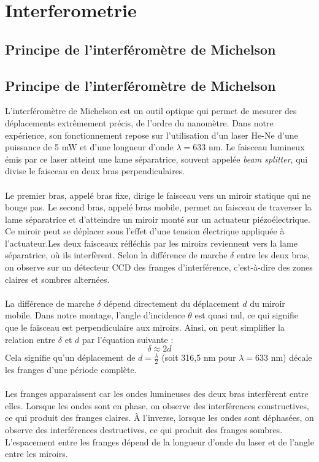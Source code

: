 \section{Interferometrie}
\subsection{Principe de l'interféromètre de Michelson}
\subsection{Principe de l'interféromètre de Michelson}

L'interféromètre de Michelson est un outil optique qui permet de mesurer des déplacements extrêmement précis, de l'ordre du nanomètre. Dans notre expérience, son fonctionnement repose sur l'utilisation d'un laser He-Ne d'une puissance de 5 mW et d'une longueur d'onde $\lambda = 633$ nm. Le faisceau lumineux émis par ce laser atteint une lame séparatrice, souvent appelée \textit{beam splitter}, qui divise le faisceau en deux bras perpendiculaires.
\\\\
Le premier bras, appelé bras fixe, dirige le faisceau vers un miroir statique qui ne bouge pas. Le second bras, appelé bras mobile, permet au faisceau de traverser la lame séparatrice et d'atteindre un miroir monté sur un actuateur piézoélectrique. Ce miroir peut se déplacer sous l'effet d'une tension électrique appliquée à l'actuateur.Les deux faisceaux réfléchis par les miroirs reviennent vers la lame séparatrice, où ils interfèrent. Selon la différence de marche $\delta$ entre les deux bras, on observe sur un détecteur CCD des franges d'interférence, c'est-à-dire des zones claires et sombres alternées.
\\\\
La différence de marche $\delta$ dépend directement du déplacement $d$ du miroir mobile. Dans notre montage, l'angle d'incidence $\theta$ est quasi nul, ce qui signifie que le faisceau est perpendiculaire aux miroirs. Ainsi, on peut simplifier la relation entre $\delta$ et $d$ par l'équation suivante :
\[
\delta \approx 2d
\]
Cela signifie qu'un déplacement de $d = \frac{\lambda}{2}$ (soit 316,5 nm pour $\lambda = 633$ nm) décale les franges d'une période complète.
\\\\
Les franges apparaissent car les ondes lumineuses des deux bras interfèrent entre elles. Lorsque les ondes sont en phase, on observe des interférences constructives, ce qui produit des franges claires. À l'inverse, lorsque les ondes sont déphasées, on observe des interférences destructives, ce qui produit des franges sombres. L'espacement entre les franges dépend de la longueur d'onde du laser et de l'angle entre les miroirs.

